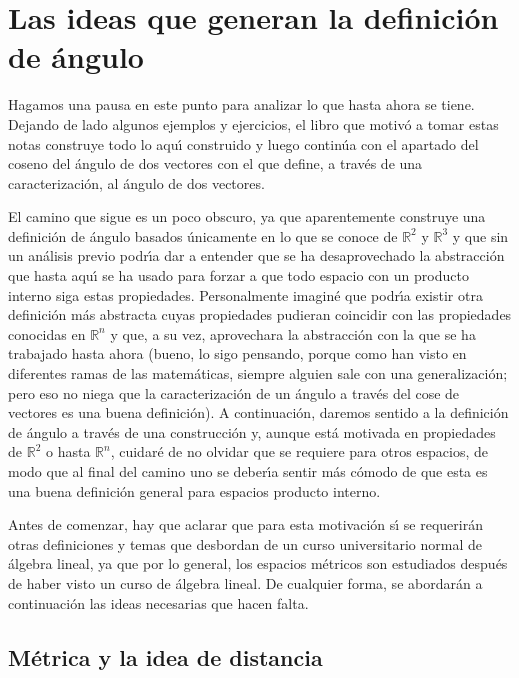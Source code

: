 \documentclass[a4paper,11pt]{article}
\theoremstyle{teoremas}
\theoremstyle{ejemplos}
\theoremstyle{definiciones}
\theoremstyle{lemas}
\begin{document}
\section{Las ideas que generan la definici\'on de \'angulo}

Hagamos una pausa en este punto para analizar lo que hasta ahora se tiene. Dejando de lado algunos ejemplos y ejercicios, el libro que motiv\'o a tomar estas notas construye todo lo aqu\'{\i} construido y luego contin\'ua con el apartado del coseno del \'angulo de dos vectores con el que define, a trav\'es de una caracterizaci\'on, al \'angulo de dos vectores.
\par 
El camino que sigue es un poco obscuro, ya que aparentemente construye una definici\'on de \'angulo basados \'unicamente en lo que se conoce de $\mathbb{R}^2$ y $\mathbb{R}^3$ y que sin un an\'alisis previo podr\'{\i}a dar a entender que se ha desaprovechado la abstracci\'on que hasta aqu\'{\i} se ha usado para forzar a que todo espacio con un producto interno siga estas propiedades. Personalmente imagin\'e que podr\'{\i}a existir otra definici\'on m\'as abstracta cuyas propiedades pudieran coincidir con las propiedades conocidas en $\mathbb{R}^n$ y que, a su vez, aprovechara la abstracci\'on con la que se ha trabajado hasta ahora (bueno, lo sigo pensando, porque como han visto en diferentes ramas de las matem\'aticas, siempre alguien sale con una generalizaci\'on; pero eso no niega que la caracterizaci\'on de un \'angulo a trav\'es del cose de vectores es una buena definici\'on). A continuaci\'on, daremos sentido a la definici\'on de \'angulo a trav\'es de una construcci\'on y, aunque est\'a motivada en propiedades de $\mathbb{R}^2$ o hasta $\mathbb{R}^n$, cuidar\'e de no olvidar que se requiere para otros espacios, de modo que al final del camino uno se deber\'{\i}a sentir m\'as c\'omodo de que esta es una buena definici\'on general para espacios producto interno.
\par 
Antes de comenzar, hay que aclarar que para esta motivaci\'on s\'{\i} se requerir\'an otras definiciones y temas que desbordan de un curso universitario normal de \'algebra lineal, ya que por lo general, los espacios m\'etricos son estudiados despu\'es de haber visto un curso de \'algebra lineal. De cualquier forma, se abordar\'an a continuaci\'on las ideas necesarias que hacen falta.

\subsection{M\'etrica y la idea de distancia}
\end{document}
